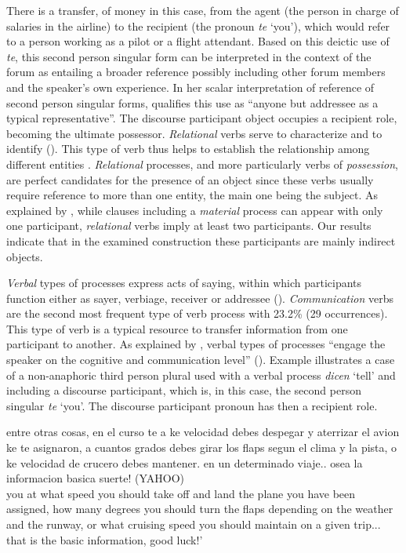 \documentclass[output=paper]{langscibook}
\begin{document}
There is a transfer, of money in this case, from the agent (the person in charge of salaries in the airline) to the recipient (the pronoun \textit{te} ‘you’), which would refer to a person working as a pilot or a flight attendant. Based on this deictic use of \textit{te}, this second person singular form can be interpreted in the context of the forum as entailing a broader reference possibly including other forum members and the speaker’s own experience. In her scalar interpretation of reference of second person singular forms, \citet[91]{Kluge2012} qualifies this use as “anyone but addressee as a typical representative”. The discourse participant object occupies a recipient role, becoming the ultimate possessor. \textit{Relational} verbs serve to characterize and to identify (\citealt[210]{HallidayMatthiessen2004}). This type of verb thus helps to establish the relationship among different entities \citep{Um-eAmmaraJaved2019}. \textit{Relational} processes, and more particularly verbs of \textit{possession}, are perfect candidates for the presence of an object since these verbs usually require reference to more than one entity, the main one being the subject. As explained by  \citet[213]{HallidayMatthiessen2004}, while clauses including a \textit{material} process can appear with only one participant, \textit{relational} verbs imply at least two participants. Our results indicate that in the examined construction these participants are mainly indirect objects. 


\textit{Verbal} types of processes express acts of saying, within which participants function either as sayer, verbiage, receiver or addressee (\citealt{HallidayMatthiessen2004}). \textit{Communication} verbs are the second most frequent type of verb process with 23.2\% (29 occurrences). This type of verb is a typical resource to transfer information from one participant to another. As explained by \citet{Pierre2021}, verbal types of processes “engage the speaker on the cognitive and communication level” (\citeyear[146]{Pierre2021}). Example  illustrates a case of a non-anaphoric third person plural used with a verbal process \textit{dicen} ‘tell’ and including a discourse participant, which is, in this case, the second person singular \textit{te} ‘you’. The discourse participant pronoun has then a recipient role. 

\ea\label{ex:pierre:12}
{{entre otras cosas, en el curso te} }{}{ {a ke velocidad debes despegar y aterrizar el avion ke te asignaron, a cuantos grados debes girar los flaps segun el clima y la pista, o ke velocidad de crucero debes mantener. en un determinado viaje.. osea la informacion basica suerte!} }{(YAHOO)}{ }\\
 { } {you at what speed you should take off and land the plane you have been assigned, how many degrees you should turn the flaps depending on the weather and the runway, or what cruising speed you should maintain on a given trip... that is the basic information, good luck!’} \\
\z 
\end{document}

